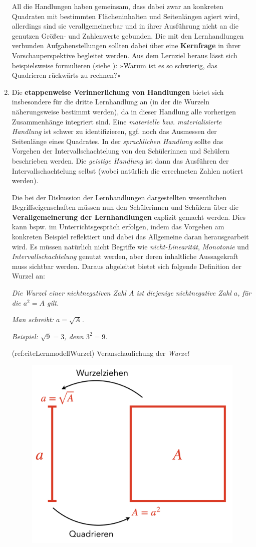 \documentclass[
]{scrbook}
\theoremstyle{definition}
\theoremstyle{definition}
\theoremstyle{definition}
\theoremstyle{definition}
\theoremstyle{remark}
\begin{document}
\begin{enumerate}
  All die Handlungen haben gemeinsam, dass dabei zwar an konkreten Quadraten mit bestimmten Flächeninhalten und Seitenlängen agiert wird, allerdings sind sie verallgemeinerbar und in ihrer Ausführung nicht an die genutzen Größen- und Zahlenwerte gebunden. Die mit den Lernhandlungen verbunden Aufgabenstellungen sollten dabei über eine \textbf{Kernfrage} in ihrer Vorschauperspektive begleitet werden. Aus dem Lernziel heraus lässt sich beispielsweise formulieren (siehe ): »Warum ist es so schwierig, das Quadrieren rückwärts zu rechnen?«
\item
  Die \textbf{etappenweise Verinnerlichung von Handlungen} bietet sich insbesondere für die dritte Lernhandlung an (in der die Wurzeln näherungsweise bestimmt werden), da in dieser Handlung alle vorherigen Zusammenhänge integriert sind. Eine \emph{materielle bzw. materialisierte Handlung} ist schwer zu identifizieren, ggf. noch das Ausmessen der Seitenlänge eines Quadrates. In der \emph{sprachlichen Handlung} sollte das Vorgehen der Intervallschachtelung von den Schülerinnen und Schülern beschrieben werden. Die \emph{geistige Handlung} ist dann das Ausführen der Intervallschachtelung selbst (wobei natürlich die errechneten Zahlen notiert werden).

  Die bei der Diskussion der Lernhandlungen dargestellten wesentlichen Begriffseigenschaften müssen nun den Schülerinnen und Schülern über die \textbf{Verallgemeinerung der Lernhandlungen} explizit gemacht werden. Dies kann bspw. im Unterrichtsgespräch erfolgen, indem das Vorgehen am konkreten Beispiel reflektiert und dabei das Allgemeine daran herausgearbeit wird. Es müssen natürlich nicht Begriffe wie \emph{nicht-Linearität}, \emph{Monotonie} und \emph{Intervallschachtelung} genutzt werden, aber deren inhaltliche Aussagekraft muss sichtbar werden. Daraus abgeleitet bietet sich folgende Definition der Wurzel an:

  \emph{Die Wurzel einer nichtnegativen Zahl \(A\) ist diejenige nichtnegative Zahl \(a\), für die \(a^2 = A\) gilt.}

  \emph{Man schreibt: \(a = \sqrt{A}\).}

  \emph{Beispiel: \(\sqrt{9} = 3\), denn \(3^2 = 9\).}

  (ref:citeLernmodellWurzel) Veranschaulichung der \emph{Wurzel}

  \begin{figure}

   {\centering \includegraphics[width=0.5\linewidth]{pictures/9-Wurzel} 

}
\end{figure}
\end{enumerate}
\end{document}
